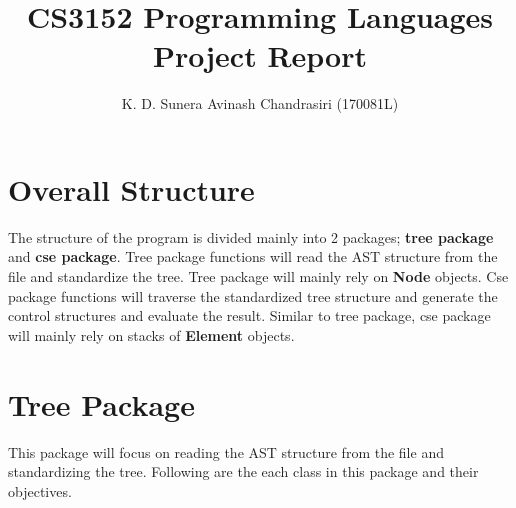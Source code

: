 \documentclass[12pt,a4paper]{article}
\title{CS3152 Programming Languages Project Report}
\author{K. D. Sunera Avinash Chandrasiri (170081L)}
\begin{document}
\maketitle
\newpage

\section{Overall Structure}
    The structure of the program is divided mainly into 2 packages; \textbf{tree package} and \textbf{cse package}. Tree package functions will read the AST structure from the file and standardize the tree. Tree package will mainly rely on \textbf{Node} objects. Cse package functions will traverse the standardized tree structure and generate the control structures and evaluate the result. Similar to tree package, cse package will mainly rely on stacks of \textbf{Element} objects. \\



\section{Tree Package}
    This package will focus on reading the AST structure from the file and standardizing the tree. Following are the each class in this package and their objectives. \\

\end{document}
